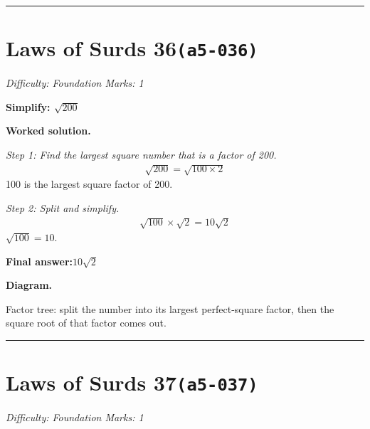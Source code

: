 \documentclass[11pt]{article}
\newcommand{\question}[1]{\par\medskip\noindent\textbf{#1}\par}
\begin{document}
\medskip\hrule

\section*{Laws of Surds 36\quad\small\texttt{(a5-036)}}
\textit{Difficulty: Foundation \quad\textbar\quad Marks: 1}

\question{Simplify: \( \sqrt{200} \)}

\textbf{Worked solution.}

\textit{Step 1: Find the largest square number that is a factor of 200.}
\[\begin{gathered}
\sqrt{200} = \sqrt{100 \times 2}
\end{gathered}\]
100 is the largest square factor of 200.

\textit{Step 2: Split and simplify.}
\[\begin{gathered}
\sqrt{100} \times \sqrt{2} = 10\sqrt{2}
\end{gathered}\]
\( \sqrt{100} = 10 \).

\begin{answerbox}
\textbf{Final answer:}\quad \(\displaystyle 10\sqrt{2}\)
\end{answerbox}
\textbf{Diagram.}

\begin{center}
\end{center}
\small Factor tree: split the number into its largest perfect-square factor, then the square root of that factor comes out.\normalsize

\medskip\hrule

\section*{Laws of Surds 37\quad\small\texttt{(a5-037)}}
\textit{Difficulty: Foundation \quad\textbar\quad Marks: 1}
\end{document}

